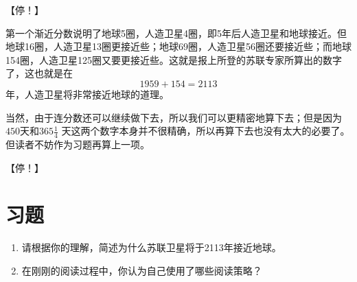 \documentclass{ctexart}
\begin{document}
【停！】

第一个渐近分数说明了地球5圈，人造卫星4圈，即5年后人造卫星和地球接近。但地球16圈，人造卫星13圈更接近些；地球69圈，人造卫星56圈还要接近些；而地球154圈，人造卫星125圈又要更接近些。这就是报上所登的苏联专家所算出的数字了，这也就是在
\begin{equation*}
1959 + 154 = 2113
\end{equation*}
年，人造卫星将非常接近地球的道理。

当然，由于连分数还可以继续做下去，所以我们可以更精密地算下去；但是因为$450$天和$365 \frac{1}{4}$ 天这两个数字本身并不很精确，所以再算下去也没有太大的必要了。但读者不妨作为习题再算上一项。

【停！】

\section{习题}
\begin{enumerate}
\item 请根据你的理解，简述为什么苏联卫星将于2113年接近地球。
\item 在刚刚的阅读过程中，你认为自己使用了哪些阅读策略？
\end{enumerate}
\end{document}
